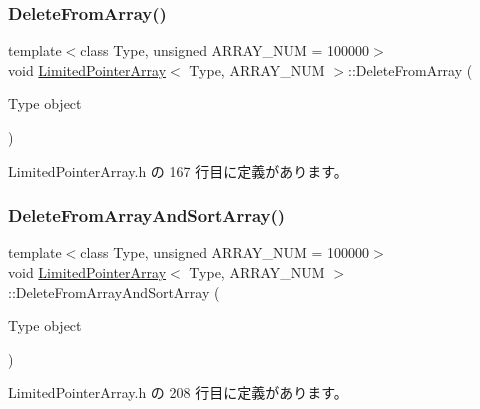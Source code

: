 \subsubsection{\texorpdfstring{Delete\+From\+Array()}{DeleteFromArray()}}
{\footnotesize\ttfamily template$<$class Type, unsigned A\+R\+R\+A\+Y\+\_\+\+N\+UM = 100000$>$ \\
void \mbox{\hyperlink{class_limited_pointer_array}{Limited\+Pointer\+Array}}$<$ Type, A\+R\+R\+A\+Y\+\_\+\+N\+UM $>$\+::Delete\+From\+Array (\begin{DoxyParamCaption}\item[{Type}]{object }\end{DoxyParamCaption})\hspace{0.3cm}{\ttfamily [inline]}}



 Limited\+Pointer\+Array.\+h の 167 行目に定義があります。

\mbox{\label{class_limited_pointer_array_a32dd58543bee490df6dcea079ebe4586}} 
\subsubsection{\texorpdfstring{Delete\+From\+Array\+And\+Sort\+Array()}{DeleteFromArrayAndSortArray()}}
{\footnotesize\ttfamily template$<$class Type, unsigned A\+R\+R\+A\+Y\+\_\+\+N\+UM = 100000$>$ \\
void \mbox{\hyperlink{class_limited_pointer_array}{Limited\+Pointer\+Array}}$<$ Type, A\+R\+R\+A\+Y\+\_\+\+N\+UM $>$\+::Delete\+From\+Array\+And\+Sort\+Array (\begin{DoxyParamCaption}\item[{Type}]{object }\end{DoxyParamCaption})\hspace{0.3cm}{\ttfamily [inline]}}



 Limited\+Pointer\+Array.\+h の 208 行目に定義があります。

\mbox{\label{class_limited_pointer_array_a404c188412a49f58ecacabd41c974de2}} 
